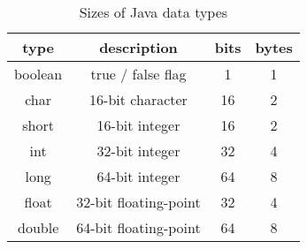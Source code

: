 \documentclass[../index.tex]{subfiles}
\begin{document}
\begin{frame}{\currenttitle}
  \begin{table}
    \begin{tabular}{c c c c}
      type & description & bits & bytes \\
      \hline{}
      boolean & true / false flag & 1 & 1\footnotemark \\
      char & 16-bit character & 16 & 2 \\
      short & 16-bit integer & 16 & 2 \\
      int & 32-bit integer & 32 & 4 \\
      long & 64-bit integer & 64 & 8 \\
      float & 32-bit floating-point & 32 & 4 \\
      double & 64-bit floating-point & 64 & 8 \\
    \end{tabular}
    \caption{Sizes of Java data types}
  \end{table}

\end{frame}

\begin{frame}{\currenttitle}
\end{frame}


\end{document}
